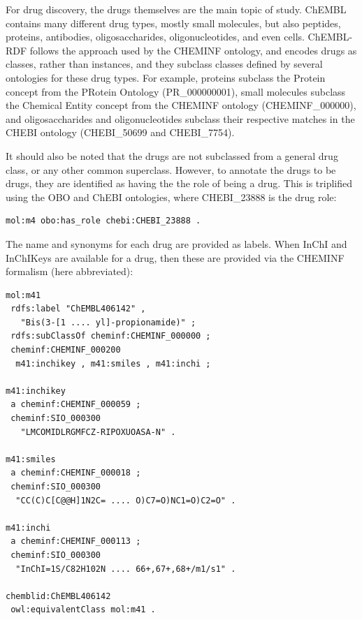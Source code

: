 \documentclass[10pt]{bmc_article}
\newenvironment{bmcformat}{\begin{raggedright}\baselineskip20pt\sloppy\setboolean{publ}{false}}{\end{raggedright}\baselineskip20pt\sloppy}
\begin{document}
\begin{bmcformat}
For drug discovery, the drugs themselves are the main topic of study.
ChEMBL contains many different drug types, mostly small molecules,
but also peptides, proteins, antibodies, oligosaccharides, oligonucleotides, and
even cells. ChEMBL-RDF follows the approach used by the CHEMINF ontology,
and encodes drugs as classes, rather than instances, and they subclass
classes defined by several ontologies for these drug types. For example, proteins subclass the
Protein concept from the PRotein Ontology (PR\_000000001), small
molecules subclass the Chemical Entity concept from the CHEMINF
ontology (CHEMINF\_000000), and oligosaccharides and oligonucleotides
subclass their respective matches in the CHEBI ontology (CHEBI\_50699
and CHEBI\_7754).

It should also be noted that the drugs are not subclassed from
a general drug class, or any other common superclass. However, to annotate
the drugs to be drugs, they are identified as having the 
the role of being a drug. This is triplified using the OBO and ChEBI
ontologies, where CHEBI\_23888 is the drug role:

\begin{small}
\begin{verbatim}
mol:m4 obo:has_role chebi:CHEBI_23888 .
\end{verbatim}
\end{small}

The name and synonyms for each drug are
provided as labels. When InChI and InChIKeys are available for a drug, then these are
provided via the CHEMINF formalism (here abbreviated):

\begin{small}
\begin{verbatim}
mol:m41
 rdfs:label "ChEMBL406142" , 
   "Bis(3-[1 .... yl]-propionamide)" ;
 rdfs:subClassOf cheminf:CHEMINF_000000 ;
 cheminf:CHEMINF_000200
  m41:inchikey , m41:smiles , m41:inchi ;

m41:inchikey
 a cheminf:CHEMINF_000059 ;
 cheminf:SIO_000300
   "LMCOMIDLRGMFCZ-RIPOXUOASA-N" .

m41:smiles
 a cheminf:CHEMINF_000018 ;
 cheminf:SIO_000300
  "CC(C)C[C@@H]1N2C= .... O)C7=O)NC1=O)C2=O" .

m41:inchi
 a cheminf:CHEMINF_000113 ;
 cheminf:SIO_000300
  "InChI=1S/C82H102N .... 66+,67+,68+/m1/s1" .

chemblid:ChEMBL406142
 owl:equivalentClass mol:m41 .
\end{verbatim}
\end{small}


\end{bmcformat}
\end{document}
